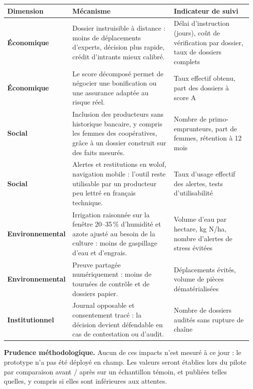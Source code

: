 \documentclass[12pt, a4paper]{article}
\begin{document}
\begin{tabularx}{\linewidth}{>{\bfseries\color{primary}}p{3.1cm} X X}
  \toprule
  \rowcolor{lightbg}
  Dimension & Mécanisme & Indicateur de suivi \\
  \midrule
  \textbf{Économique} &
  Dossier instruisible à distance : moins de déplacements d'experts, décision plus rapide,
  crédit d'intrants mieux calibré. &
  Délai d'instruction (jours), coût de vérification par dossier, taux de dossiers complets \\
  \addlinespace
  \textbf{Économique} &
  Le score décomposé permet de négocier une bonification ou une assurance adaptée au risque réel. &
  Taux effectif obtenu, part des dossiers à score A \\
  \addlinespace
  \textbf{Social} &
  Inclusion des producteurs sans historique bancaire, y compris les femmes des coopératives,
  grâce à un dossier construit sur des faits mesurés. &
  Nombre de primo-emprunteurs, part de femmes, rétention à 12 mois \\
  \addlinespace
  \textbf{Social} &
  Alertes et restitutions en wolof, navigation mobile : l'outil reste utilisable par un
  producteur peu lettré en français technique. &
  Taux d'usage effectif des alertes, tests d'utilisabilité \\
  \addlinespace
  \textbf{Environnemental} &
  Irrigation raisonnée sur la fenêtre 20–35\,\% d'humidité et azote ajusté au besoin de la
  culture : moins de gaspillage d'eau et d'engrais. &
  Volume d'eau par hectare, kg N/ha, nombre d'alertes de stress évitées \\
  \addlinespace
  \textbf{Environnemental} &
  Preuve partagée numériquement : moins de tournées de contrôle et de dossiers papier. &
  Déplacements évités, volume de pièces dématérialisées \\
  \addlinespace
  \textbf{Institutionnel} &
  Journal opposable et consentement tracé : la décision devient défendable en cas de
  contestation ou d'audit. &
  Nombre de dossiers audités sans rupture de chaîne \\
  \bottomrule
\end{tabularx}

\vspace{0.5cm}

\begin{mdframed}[style=primary]
\textbf{Prudence méthodologique.} Aucun de ces impacts n'est mesuré à ce jour : le
prototype n'a pas été déployé en champ. Les valeurs seront établies lors du pilote par
comparaison avant / après sur un échantillon témoin, et publiées telles quelles, y compris
si elles sont inférieures aux attentes.
\end{mdframed}
\end{document}
